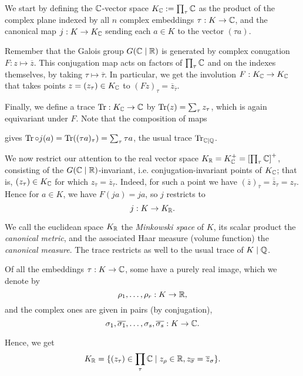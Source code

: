 We start by defining the $\mathbb{C}$-vector space $K_{\mathbb{C}} := \prod_\tau \mathbb{C}$ as the product of the complex plane indexed by all $n$ complex embeddings $\tau:K\to\mathbb{C}$, and the canonical map $j:K\to K_{\mathbb{C}}$ sending each $a\in K$ to the vector $(\tau a)$.

Remember that the Galois group $G(\mathbb{C}\mid\mathbb{R})$ is generated by complex conugation $F:z\mapsto\overline{z}$. This conjugation map acts on factors of $\prod_\tau\mathbb{C}$ and on the indexes themselves, by taking $\tau\mapsto\overline{\tau}$. In particular, we get the involution $F:K_{\mathbb{C}}\to K_{\mathbb{C}}$ that takes points $z=(z_\tau)\in K_{\mathbb{C}}$ to $(Fz)_\tau = \overline{z}_{\overline{\tau}}$.

Finally, we define a trace $\operatorname{Tr}:K_{\mathbb{C}}\to\mathbb{C}$ by $\operatorname{Tr}(z) = \sum_\tau z_\tau$, which is again equivariant under $F$. Note that the composition of maps
\begin{center}
\end{center}

gives $\operatorname{Tr}\circ j(a) = \operatorname{Tr}((\tau a)_\tau) = \sum_\tau \tau a$, the usual trace $\operatorname{Tr}_{\mathbb{C}\mid\mathbb{Q}}$.

We now restrict our attention to the real vector space $K_{\mathbb{R}} = K_{\mathbb{C}}^+ = \left[\prod_\tau\mathbb{C}\right]^+$, consisting of the $G(\mathbb{C}\mid\mathbb{R})$-invariant, i.e. conjugation-invariant points of $K_{\mathbb{C}}$; that is, $(z_\tau)\in K_{\mathbb{C}}$ for which $z_{\overline{\tau}}=\overline{z}_\tau$. Indeed, for such a point we have $(\overline{z})_{\overline{\tau}}= \overline{\overline{z}}_\tau = z_\tau$. Hence for $a\in K$, we have $F(ja)=ja$, so $j$ restricts to
\[
	j : K\to K_{\mathbb{R}}.
\]

We call the euclidean space $K_{\mathbb{R}}$ the \emph{Minkowski space} of $K$, its scalar product the \emph{canonical metric}, and the associated Haar measure (volume function) the \emph{canonical measure}. The trace restricts as well to the usual trace of $K\mid\mathbb{Q}$.

Of all the embeddings $\tau:K\to\mathbb{C}$, some have a purely real image, which we denote by
\[
	\rho_1,\dots,\rho_r:K\to\mathbb{R},
\]
and the complex ones are given in pairs (by conjugation),
\[
	\sigma_1,\overline{\sigma_1},\dots,\sigma_s,\overline{\sigma_s}:K\to\mathbb{C}.
\]

Hence, we get 
\[
	K_{\mathbb{R}} = \{(z_\tau)\in\prod_\tau\mathbb{C} \mid z_\rho\in\mathbb{R}, z_{\overline{\sigma}} = \overline{z}_\sigma\}.
\]



